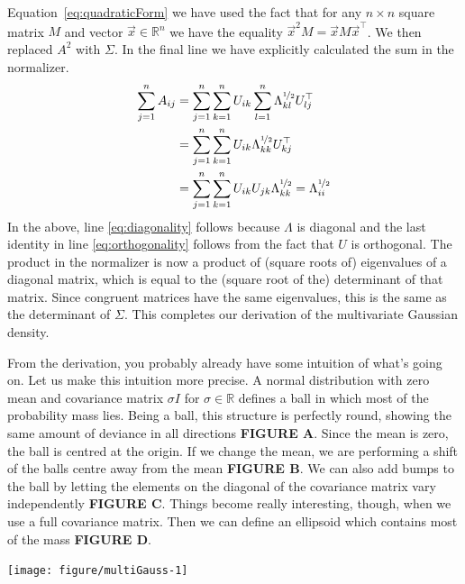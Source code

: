 Equation~\eqref{eq:quadraticForm} we have 
used the fact that for any $ n\times n $ square matrix $ M $ and vector $ \vec{x} \in \mathbb{R}^{n} $ we have the equality $ \vec{x}^{2}M = \vec{x}M\vec{x}^{\top} $.
We then replaced $ A^{2} $ with $ \Sigma $. In the final line we have explicitly calculated the sum in the normalizer.
\begin{align}
\sum_{j=1}^{n}A_{ij} &= \sum_{j=1}^{n} \sum_{k=1}^{n} U_{ik} \sum_{l=1}^{n} \Lambda^{\nicefrac{1}{2}}_{kl} U^{\top}_{lj} \\
&= \sum_{j=1}^{n} \sum_{k=1}^{n} U_{ik} \Lambda^{\nicefrac{1}{2}}_{kk} U^{\top}_{kj} \label{eq:diagonality} \\
&= \sum_{j=1}^{n} \sum_{k=1}^{n} U_{ik} U_{jk} \Lambda_{kk}^{\nicefrac{1}{2}} = \Lambda_{ii}^{\nicefrac{1}{2}} \label{eq:orthogonality}
\end{align}
In the above, line \eqref{eq:diagonality} follows because $ \Lambda $ is diagonal and the last identity in line \eqref{eq:orthogonality} follows from the fact that
$ U $ is orthogonal. The product in the normalizer is now a product of (square roots of) eigenvalues of a diagonal matrix, which is equal to the (square root of the) 
determinant of that matrix. Since congruent matrices have the same eigenvalues, this is the same as the determinant of $ \Sigma $. This completes our derivation of the multivariate Gaussian density.

From the derivation, you probably already have some intuition of what's going on. Let us make this intuition more precise. A normal distribution with zero mean
and covariance matrix $ \sigma I $ for $ \sigma \in \mathbb{R} $ defines a ball in which most of the probability mass lies. Being a ball, this structure is perfectly
round, showing the same amount of deviance in all directions \textbf{FIGURE A}. Since the mean is zero, the ball is centred at the origin. If we change the mean, we are 
performing a shift of the balls centre away from the mean \textbf{FIGURE B}. We can also add bumps to the ball by letting the elements on the diagonal of the
covariance matrix vary independently \textbf{FIGURE C}. Things become really interesting, though, when we use a full covariance matrix. Then we can define an
ellipsoid which contains most of the mass \textbf{FIGURE D}. 

\begin{knitrout}
\color{fgcolor}\begin{kframe}


{\ttfamily\noindent\bfseries{}}\end{kframe}
\texttt{[image: figure/multiGauss-1]} 

\end{knitrout}

